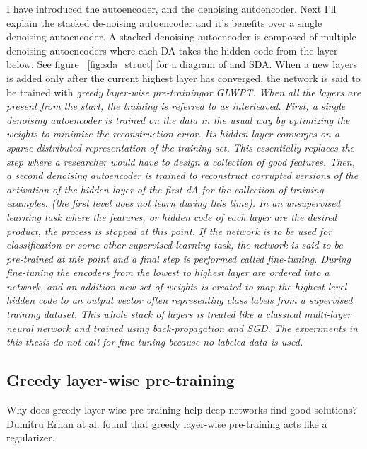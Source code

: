 \documentclass[12pt]{article}
\begin{document}
\begin{doublespacing}
I have introduced the autoencoder, and the denoising autoencoder. Next I'll explain the stacked de-noising autoencoder and it's benefits over a single denoising autoencoder. A stacked denoising autoencoder is composed of multiple denoising autoencoders where each DA takes the hidden code from the layer below. See figure ~\ref{fig:sda_struct} for a diagram of and SDA. When a new layers is added only after the current highest layer has converged, the network is said to be trained with \em greedy layer-wise pre-training\em or GLWPT. When all the layers are present from the start, the training is referred to as interleaved. First, a single denoising autoencoder is trained on the data in the usual way by optimizing the weights to minimize the reconstruction error. Its hidden layer converges on a sparse distributed representation of the training set. This essentially replaces the step where a researcher would have to design a collection of good features. Then, a second denoising autoencoder is trained to reconstruct corrupted versions of the activation of the hidden layer of the first dA for the collection of training examples. (the first level does not learn during this time). In an unsupervised learning task where the features, or hidden code of each layer are the desired product, the process is stopped at this point. If the network is to be used for classification or some other supervised learning task, the network is said to be pre-trained at this point and a final step is performed called fine-tuning. During fine-tuning the encoders from the lowest to highest layer are ordered into a network, and an addition new set of weights is created to map the highest level hidden code to an output vector often representing class labels from a supervised training dataset. This whole stack of layers is treated like a classical multi-layer neural network and trained using back-propagation and SGD. The experiments in this thesis do not call for fine-tuning because no labeled data is used.

	\subsection{Greedy layer-wise pre-training}
	Why does greedy layer-wise pre-training help deep networks find good solutions? Dumitru Erhan at al. found that greedy layer-wise pre-training acts like a regularizer. 
	\cite{bengio2007greedy}



\end{doublespacing}
\end{document}
